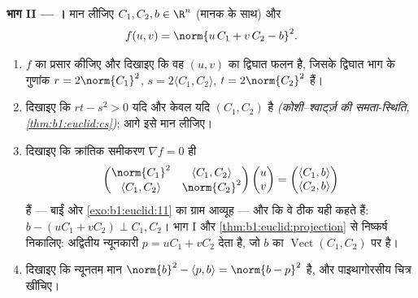 \begin{problem}
\medskip
\noindent\textbf{भाग II --- ।} मान लीजिए $C_1, C_2, b \in
\R^n$ (मानक  के साथ) और
\[
f(u, v) = \norm{u\,C_1 + v\,C_2 - b}^2 .
\]
\begin{enumerate}[resume]
  \item $f$ का प्रसार कीजिए और दिखाइए कि वह $(u, v)$ का द्विघात फलन है,
        जिसके द्विघात भाग के गुणांक $r = 2\norm{C_1}^2$, $s = 2\langle
        C_1, C_2\rangle$, $t = 2\norm{C_2}^2$ हैं।
  \item दिखाइए कि $rt - s^2 > 0$ यदि और केवल यदि $(C_1, C_2)$ 
        है \emph{(कोशी--श्वार्ट्ज़ की समता-स्थिति,
        \cref{thm:b1:euclid:cs})}; आगे इसे मान लीजिए।
  \item दिखाइए कि क्रांतिक समीकरण $\nabla f = 0$ ही
        \emph{}
        \[
        \begin{pmatrix}
        \norm{C_1}^2 & \langle C_1, C_2\rangle\\
        \langle C_1, C_2\rangle & \norm{C_2}^2
        \end{pmatrix}
        \begin{pmatrix} u\\ v\end{pmatrix}
        =
        \begin{pmatrix} \langle C_1, b\rangle\\ \langle C_2,
        b\rangle\end{pmatrix}
        \]
        हैं --- बाईं ओर \cref{exo:b1:euclid:11} का ग्राम आव्यूह --- और
        कि वे ठीक यही कहते हैं: $b - (uC_1 + vC_2) \perp C_1, C_2$। भाग
        I और \cref{thm:b1:euclid:projection} से निष्कर्ष निकालिए:
        अद्वितीय न्यूनकारी $p = uC_1 + vC_2$ देता है, जो $b$ का
        $\operatorname{Vect}(C_1, C_2)$ पर  है।
  \item दिखाइए कि न्यूनतम मान $\norm{b}^2 - \langle p, b\rangle =
        \norm{b - p}^2$ है, और पाइथागोरसीय चित्र खींचिए।
\end{enumerate}


\end{problem}
